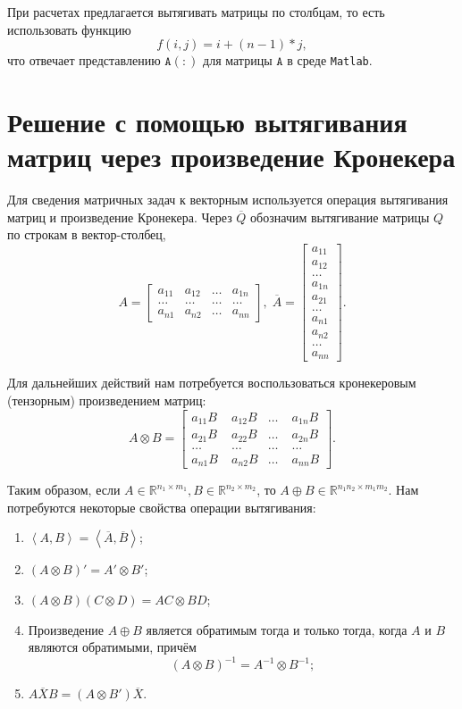 \documentclass[12pt]{article}
\theoremstyle{rusdef}
\newcommand{\scalar}[2]{\left<#1,#2\right>}
\newcommand{\R}{\ensuremath{\mathbb{R}}} %
\begin{document}
При расчетах предлагается вытягивать матрицы по столбцам, то есть использовать функцию\\
$$
f(i,j) = i + (n-1)*j,
$$
что отвечает представлению $\mathtt{A(:)}$ для матрицы $\mathtt{A}$ в среде \texttt{Matlab}.

\section{Решение с помощью вытягивания матриц через произведение Кронекера}
Для сведения матричных задач к векторным используется операция вытягивания матриц и произведение Кронекера. Через $\overline{Q}$ обозначим вытягивание матрицы $Q$ по строкам в вектор-столбец,
$$
A = \left[
\begin{aligned}
a_{11} & a_{12} & \ldots & a_{1n} \\
\ldots & \ldots & \ldots & \ldots \\
a_{n1} & a_{n2} & \ldots & a_{nn}
\end{aligned}
\right], \;
\overline{A} = \left[
\begin{aligned}
a_{11} \\
a_{12} \\
\ldots \\
a_{1n} \\
a_{21} \\
\ldots \\
a_{n1} \\
a_{n2} \\
\ldots \\
a_{nn}
\end{aligned}
\right].
$$

Для дальнейших действий нам потребуется воспользоваться кронекеровым (тензорным) произведением матриц:
$$
A \otimes B = \left[
\begin{aligned}
a_{11}B \; & a_{12}B & \ldots \; & a_{1n}B \\
a_{21}B \; & a_{22}B & \ldots \; & a_{2n}B \\
\ldots \; & \ldots & \ldots \; & \ldots \\
a_{n1}B \; & a_{n2}B & \ldots \; & a_{nn}B
\end{aligned}
\right].
$$

Таким образом, если $A \in \R^{n_1 \times m_1}, B \in \R^{n_2 \times m_2}$, то $A \oplus B \in \R^{n_1n_2 \times m_1m_2}$. Нам потребуются некоторые свойства операции вытягивания:
\begin{enumerate}
\item
$\scalar{A}{B} = \scalar{\overline{A}}{\overline{B}}$;	
\item
$(A \otimes B)' = A' \otimes B'$;
\item
$(A \otimes B)(C \otimes D) = AC \otimes BD$;
\item
Произведение $A \oplus B$ является обратимым тогда и только тогда, когда $A$ и $B$ являются обратимыми, причём
$$
(A \otimes B)^{-1} = A^{-1} \otimes B^{-1};
$$
\item
$\overline{AXB} = (A \otimes B')\overline{X}$.
\end{enumerate}
\end{document}
